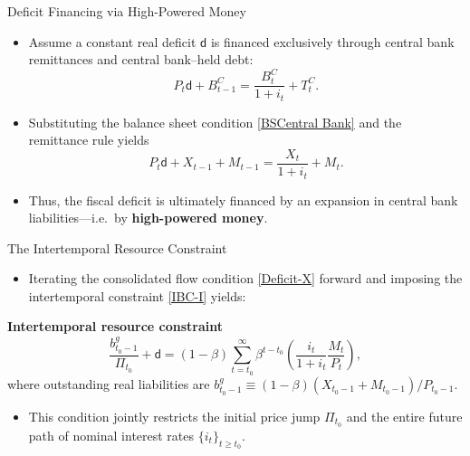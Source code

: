 \documentclass[11pt,aspectratio=169]{beamer}
\begin{document}
\begin{frame}{Deficit Financing via High-Powered Money}
\small
\begin{itemize}
    \item Assume a constant real deficit \(\mathsf{d}\) is financed exclusively through central bank remittances and central bank–held debt:
    \[
    P_{t}\mathsf{d}+B_{t-1}^{C}=\frac{B_{t}^{C}}{1+i_{t}}+T_{t}^{C}.
    \]
    \item Substituting the balance sheet condition \eqref{BSCentral Bank} and the remittance rule yields
    \begin{equation}
    P_{t}\mathsf{d}+X_{t-1}+M_{t-1}=\frac{X_{t}}{1+i_{t}}+M_{t}.
    \label{Deficit-X}
    \end{equation}
    \item Thus, the fiscal deficit is ultimately financed by an expansion in central bank liabilities—i.e.\ by \textbf{high-powered money}.
\end{itemize}
\end{frame}


\begin{frame}{The Intertemporal Resource Constraint}
\small
\begin{itemize}
    \item Iterating the consolidated flow condition \eqref{Deficit-X} forward and imposing the intertemporal constraint \eqref{IBC-I} yields:
\end{itemize}

\vspace{0.2cm}
\textbf{Intertemporal resource constraint}
\begin{equation}
\frac{b_{t_{0}-1}^{g}}{\Pi _{t_{0}}}+\mathsf{d}
=(1-\beta)\sum_{t=t_{0}}^{\infty }\beta ^{t-t_{0}}
\left( \frac{i_{t}}{1+i_{t}}\frac{M_{t}}{P_{t}}\right),
\label{Key}
\end{equation}
\hspace{0.65cm} where outstanding real liabilities are
\(b_{t_{0}-1}^{g}\equiv (1-\beta)(X_{t_{0}-1}+M_{t_{0}-1})/P_{t_{0}-1}\).

\begin{itemize}
    \item This condition jointly restricts the initial price jump \(\Pi_{t_0}\) and the entire future path of nominal interest rates \(\{i_t\}_{t\ge t_0}\).
\end{itemize}
\end{frame}
\end{document}
